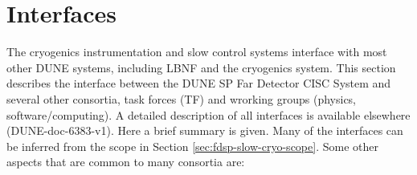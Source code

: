 \section{Interfaces}
\label{sec:fdsp-slow-cryo-intfc}



The cryogenics instrumentation and slow control systems interface with most other DUNE systems, including LBNF and the cryogenics system.
This section describes the interface between the DUNE SP Far Detector CISC System
and several other consortia, task forces (TF) and wrorking groups (physics, software/computing). 
A detailed description of all interfaces is available elsewhere (DUNE-doc-6383-v1). Here a brief summary is given.
Many of the interfaces can be inferred from the scope in Section \ref{sec:fdsp-slow-cryo-scope}. 
Some other aspects that are common to many consortia are: 
